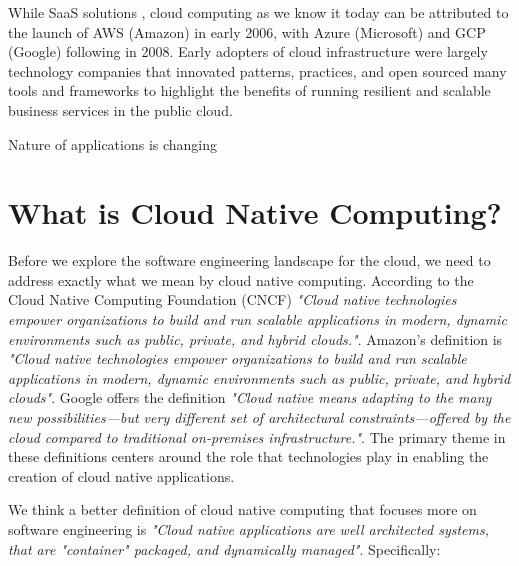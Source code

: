 \documentclass[conference]{IEEEconf}
\begin{document}
While SaaS solutions , cloud computing as we know it today can be attributed to the launch of AWS (Amazon) \cite{AWSLaunch} in early 2006, with Azure (Microsoft)\cite{AzureLaunch} and GCP (Google)\cite{GCPLaunch} following in 2008. Early adopters of cloud infrastructure were largely technology companies that innovated patterns, practices, and open sourced many tools and frameworks to highlight the benefits of running resilient and scalable business services in the public cloud.  


Nature of applications is changing


\section{What is Cloud Native Computing?}
\label{sec:WhatIsCNF}
Before we explore the software engineering landscape for the cloud, we need to address exactly what we mean by cloud native computing.  According to the Cloud Native Computing Foundation (CNCF)\cite{CNCFHome}  \textit{"Cloud native technologies empower organizations to build and run scalable applications in modern, dynamic environments such as public, private, and hybrid clouds."}.  Amazon's definition is \textit{"Cloud native technologies empower organizations to build and run scalable applications in modern, dynamic environments such as public, private, and hybrid clouds"}. Google offers the definition \textit{"Cloud native means adapting to the many new possibilities—but very different set of architectural constraints—offered by the cloud compared to traditional on-premises infrastructure."}.  The primary theme in these definitions centers around the role that technologies play in enabling the creation of cloud native applications.

We think a better definition of cloud native computing that focuses more on  software engineering is \textit{"Cloud native applications are well architected systems, that are "container" packaged, and dynamically managed"}. Specifically:
\end{document}
